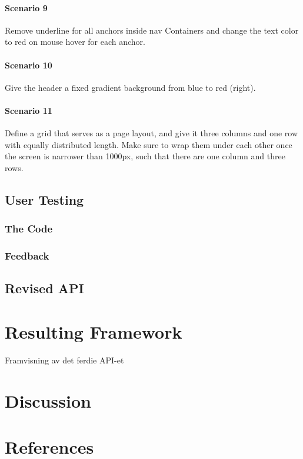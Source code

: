 \documentclass[12pt]{article}
\begin{document}
        \paragraph{Scenario 9}
        Remove underline for all anchors inside nav Containers and change the text color to red on mouse hover for each anchor.
            
        \paragraph{Scenario 10}
        Give the header a fixed gradient background from blue to red (right).

        \paragraph{Scenario 11}
        Define a grid that serves as a page layout, and give it three columns and one row with equally distributed length. Make sure to wrap them under each other once the screen is narrower than 1000px, such that there are one column and three rows.

    \subsection{User Testing}

        \subsubsection{The Code}

        \subsubsection{Feedback}

    \subsection{Revised API}

\section{Resulting Framework}
Framvisning av det ferdie API-et

\section{Discussion}

\section{References}
\end{document}
